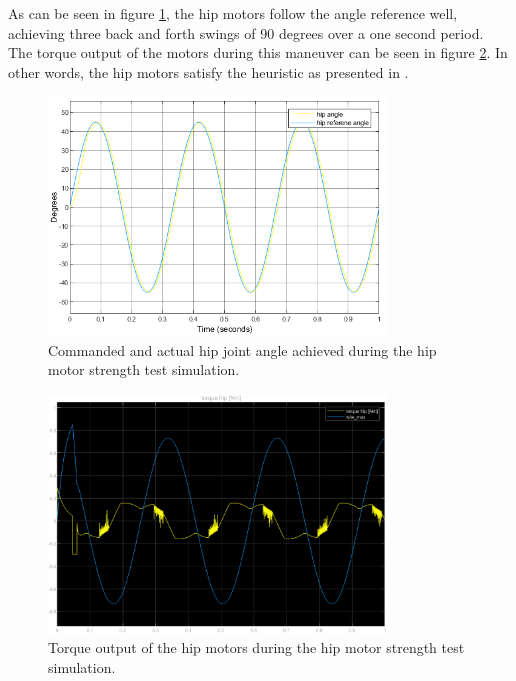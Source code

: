 As can be seen in figure \ref{fig:hip_motor_strength_test}, the hip motors follow the angle reference well, achieving three back and forth swings of 90 degrees over a one second period. The torque output of the motors during this maneuver can be seen in figure \ref{fig:hip_motor_torque_test}. In other words, the hip motors satisfy the heuristic as presented in \cite{finn_tarek_master}.

\begin{figure}[H]
    \centering
    \includegraphics[width=0.8\textwidth]{Images/paw_swing_test.png}
    \caption{Commanded and actual hip joint angle achieved during the hip motor strength test simulation. }
    \label{fig:hip_motor_strength_test}
\end{figure}

\begin{figure}[H]
    \centering
    \includegraphics[width=0.8\textwidth]{Images/hip_motor_torque.eps}
    \caption{Torque output of the hip motors during the hip motor strength test simulation.}
    \label{fig:hip_motor_torque_test}
\end{figure}


